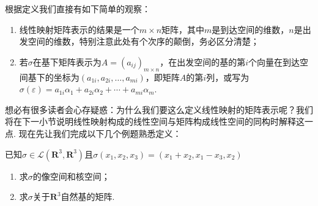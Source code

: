 根据定义我们直接有如下简单的观察：
\begin{enumerate}
    \item 线性映射矩阵表示的结果是一个$m\times n$矩阵，其中$m$是到达空间的维数，$n$是出发空间的维数，特别注意此处有个次序的颠倒，务必区分清楚；

    \item 若$\sigma$在基下矩阵表示为$A=(a_{ij})_{m\times n}$，在出发空间的基的第$i$个向量在到达空间基下的坐标为$(a_{1i},a_{2i},\ldots,a_{mi})$，即矩阵$A$的第$i$列，或写为$\sigma(\varepsilon)=a_{1i}\alpha_1+a_{2i}\alpha_2+\cdots+a_{mi}\alpha_m$.
\end{enumerate}

想必有很多读者会心存疑惑：为什么我们要这么定义线性映射的矩阵表示呢？我们将在下一小节说明线性映射构成的线性空间与矩阵构成线性空间的同构时解释这一点. 现在先让我们完成以下几个例题熟悉定义：
\begin{example}\label{ex:7:矩阵表示1}
    已知$\sigma \in \mathcal{L}(\mathbf{R}^3,\mathbf{R}^3)$且$\sigma(x_1,x_2,x_3)=(x_1+x_2,x_1-x_3, x_2)$
    \begin{enumerate}
        \item 求$\sigma$的像空间和核空间；

        \item 求$\sigma$关于$\mathbf{R}^3$自然基的矩阵.
    \end{enumerate}
\end{example}

